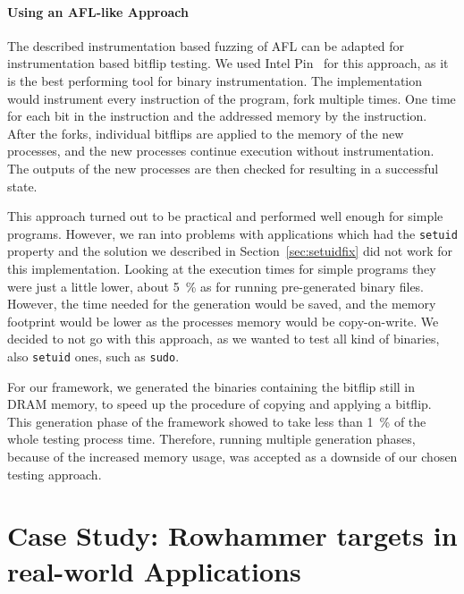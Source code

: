\subsubsection{Using an AFL-like Approach}

The described instrumentation based fuzzing of AFL can be adapted for
instrumentation based bitflip testing. We used Intel Pin~\cite{pintool} for this
approach, as it is the best performing tool for binary instrumentation. The
implementation would instrument every instruction of the program, fork multiple
times. One time for each bit in the instruction and the addressed memory by the
instruction. After the forks, individual bitflips are applied to the memory of
the new processes, and the new processes continue execution without
instrumentation. The outputs of the new processes are then checked for resulting
in a successful state.

This approach turned out to be practical and performed well enough for simple
programs. However, we ran into problems with applications which had the
\texttt{setuid} property and the solution we described in
Section~\ref{sec:setuidfix} did not work for this implementation. Looking at
the execution times for simple programs they were just a little lower, about
\SI{5}{\percent} as for running pre-generated binary files. However, the time
needed for the generation would be saved, and the memory footprint would be
lower as the processes memory would be copy-on-write. We decided to not go with
this approach, as we wanted to test all kind of binaries, also \texttt{setuid}
ones, such as \texttt{sudo}.

For our framework, we generated the binaries containing the bitflip still in
DRAM memory, to speed up the procedure of copying and applying a bitflip. This
generation phase of the framework showed to take less than \SI{1}{\percent} of
the whole testing process time. Therefore, running multiple generation phases,
because of the increased memory usage, was accepted as a downside of our chosen
testing approach.


\chapter{Case Study: Rowhammer targets in real-world Applications}
\label{sec:results}

